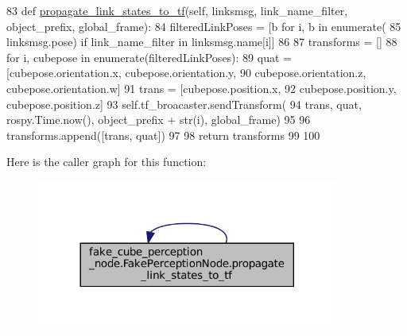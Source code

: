 \begin{DoxyCode}
83     \textcolor{keyword}{def }\hyperlink{classfake__cube__perception__node_1_1FakePerceptionNode_aeac788f768e625ecbe445c6af105d3f8}{propagate\_link\_states\_to\_tf}(self, linksmsg,  link\_name\_filter, 
      object\_prefix, global\_frame):
84         filteredLinkPoses = [b \textcolor{keywordflow}{for} i, b \textcolor{keywordflow}{in} enumerate(
85             linksmsg.pose) \textcolor{keywordflow}{if} link\_name\_filter \textcolor{keywordflow}{in} linksmsg.name[i]]
86 
87         transforms = []
88         \textcolor{keywordflow}{for} i, cubepose \textcolor{keywordflow}{in} enumerate(filteredLinkPoses):
89             quat = [cubepose.orientation.x, cubepose.orientation.y,
90                     cubepose.orientation.z, cubepose.orientation.w]
91             trans = [cubepose.position.x,
92                      cubepose.position.y, cubepose.position.z]
93             self.tf\_broacaster.sendTransform(
94                 trans, quat, rospy.Time.now(), object\_prefix + str(i), global\_frame)
95 
96             transforms.append([trans, quat])
97 
98         \textcolor{keywordflow}{return} transforms
99 
100 
\end{DoxyCode}
Here is the caller graph for this function\+:
\nopagebreak
\begin{figure}[H]
\begin{center}
\leavevmode
\includegraphics[width=281pt]{classfake__cube__perception__node_1_1FakePerceptionNode_aeac788f768e625ecbe445c6af105d3f8_icgraph}
\end{center}
\end{figure}
\mbox{\label{classfake__cube__perception__node_1_1FakePerceptionNode_aeac788f768e625ecbe445c6af105d3f8}} 
